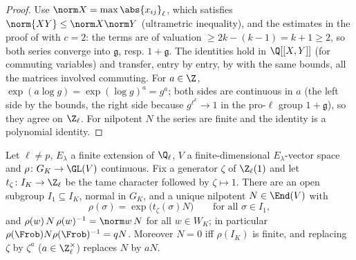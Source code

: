 \begin{proof}
Use $\norm X=\max\abs{x_{ij}}_\ell$, which satisfies $\norm{XY}\le\norm X\norm Y$ (ultrametric inequality), and the estimates in the proof of
 with $c=2$: the terms are of valuation $\ge2k-(k-1)=k+1\ge2$, so both series converge into $\mathfrak g$, resp.
$1+\mathfrak g$. The identities hold in $\Q[[X,Y]]$ (for commuting variables) and transfer, entry by entry, by  with the
same bounds, all the matrices involved commuting. For $a\in\Z$, $\exp(a\log g)=\exp(\log g)^a=g^a$; both sides are continuous in $a$ (the left side by
the bounds, the right side because $g^{\ell^k}\to1$ in the pro-$\ell$ group $1+\mathfrak g$), so they agree on $\Z_\ell$. For nilpotent $N$ the series are
finite and the identity is a polynomial identity.
\end{proof}

\begin{theorem}\label{thm:local:grothendieck}
Let $\ell\ne p$, $E_\lambda$ a finite extension of $\Q_\ell$, $V$ a finite-dimensional $E_\lambda$-vector space and $\rho\colon G_K\to\GL(V)$ continuous. Fix a generator
$\zeta$ of $\Z_\ell(1)$ and let $t_\zeta\colon I_K\to\Z_\ell$ be the tame character followed by $\zeta\mapsto1$. There are an open subgroup $I_1\subseteq I_K$, normal in $G_K$,
and a unique nilpotent $N\in\End(V)$ with
\[
\rho(\sigma)=\exp\bigl(t_\zeta(\sigma)N\bigr)\qquad\text{for all }\sigma\in I_1,
\]
and $\rho(w)\,N\,\rho(w)^{-1}=\norm w\,N$ for all $w\in W_K$; in particular $\rho(\Frob)N\rho(\Frob)^{-1}=qN$. Moreover $N=0$ iff $\rho(I_K)$ is finite, and replacing
$\zeta$ by $\zeta^a$ ($a\in\Z_\ell^\times$) replaces $N$ by $aN$.
\end{theorem}

